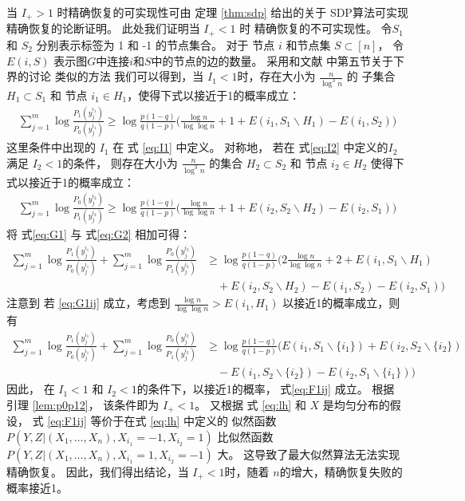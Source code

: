 当 $I_+ > 1$ 时精确恢复的可实现性可由 定理 \ref{thm:sdp}  给出的关于 SDP算法可实现精确恢复的论断证明。
此处我们证明当 $I_+ < 1$ 时 
精确恢复的不可实现性。
令$S_1$ 和 $S_2$ 分别表示标签为 1 和 -1 的节点集合。
对于 节点 $i$ 和节点集 $S\subset [n]$，
令 $E(i,S)$ 表示图$G$中连接$i$和$S$中的节点的边的数量。
采用和文献  中第五节关于下界的讨论 类似的方法
我们可以得到，当 $I_1<1$时，存在大小为 $\frac{n}{\log^3 n}$  的 子集合
    $H_1\subset S_1$ 和 节点 $i_1\in H_1$，使得下式以接近于1的概率成立：
\begin{align}
    \sum_{j=1}^{m} \log \frac{P_1(y^{i_1}_{j})}{P_0(y^{i_1}_{j})}
    \ge \log \frac{p(1-q)}{q(1-p)}\Big(\frac{\log n}{\log\log n}+1
    +E(i_1, S_1 \backslash H_1) - E(i_1, S_2) \Big) \label{eq:G1}
\end{align}
这里条件中出现的 $I_1$ 在 式 \eqref{eq:I1} 中定义。
对称地， 若在 式\eqref{eq:I2} 中定义的$I_2$满足  $I_2<1$的条件，
则存在大小为 $\frac{n}{\log^3 n}$  的集合
    $H_2\subset S_2$ 和 节点 $i_2\in H_2$ 使得下式以接近于1的概率成立：
    \begin{align}
        \sum_{j=1}^{m} \log \frac{P_0(y^{i_2}_{j})}{P_1(y^{i_2}_{j})}
        \ge \log \frac{p(1-q)}{q(1-p)}\Big(\frac{\log n}{\log\log n}+1
        +E(i_2, S_2 \backslash H_2) - E(i_2, S_1) \Big) \label{eq:G2}
    \end{align}	
将 式\eqref{eq:G1} 与 式\eqref{eq:G2} 相加可得：
\begin{align}
    \sum_{j=1}^{m} \log \frac{P_1(y^{i_1}_{j})}{P_0(y^{i_1}_{j})}
    +\sum_{j=1}^{m} \log \frac{P_0(y^{i_2}_{j})}{P_1(y^{i_2}_{j})}
    &\ge \log \frac{p(1-q)}{q(1-p)}\Big(2\frac{\log n}{\log\log n}+2+E(i_1, S_1 \backslash H_1) \nonumber\\
    &\quad + E(i_2, S_2 \backslash H_2)- E(i_1, S_2 ) - E(i_2, S_1 )\Big) \label{eq:G1ij}
\end{align}	
    注意到 若 \eqref{eq:G1ij} 成立，考虑到 $\frac{\log n}{\log \log n} > E(i_1, H_1)$ 
    以接近1的概率成立，则有
\begin{align}
    \sum_{j=1}^{m} \log \frac{P_1(y^{i_1}_{j})}{P_0(y^{i_1}_{j})}
    +\sum_{j=1}^{m} \log \frac{P_0(y^{i_2}_{j})}{P_1(y^{i_2}_{j})}
    &\ge \log \frac{p(1-q)}{q(1-p)}(E(i_1, S_1 \backslash \{i_1\}) + E(i_2, S_2 \backslash \{i_2\})\nonumber\\
    &\quad - E(i_1, S_2 \backslash \{i_2\}) - E(i_2, S_1 \backslash \{i_1\})) \label{eq:F1ij}
\end{align}
因此， 在 $I_1<1$ 和 $I_2<1$的条件下，以接近1的概率，
式\eqref{eq:F1ij} 成立。
根据 引理 \ref{lem:p0p12}，
该条件即为 $I_+<1$。
又根据 式 \eqref{eq:lh} 和 $X$ 是均匀分布的假设，
式 \eqref{eq:F1ij} 等价于在式 \eqref{eq:lh} 中定义的 似然函数
$P(Y,Z|(X_1,\ldots,X_n),X_{i_1}=-1,X_{i_2}=1)$
比似然函数
$P(Y,Z|(X_1,\ldots,X_n),X_{i_1}=1,X_{i_2}=-1)$
大。
这导致了最大似然算法无法实现精确恢复。
因此，我们得出结论，当 $I_+<1$时，随着 $n$的增大，精确恢复失败的概率接近1。

